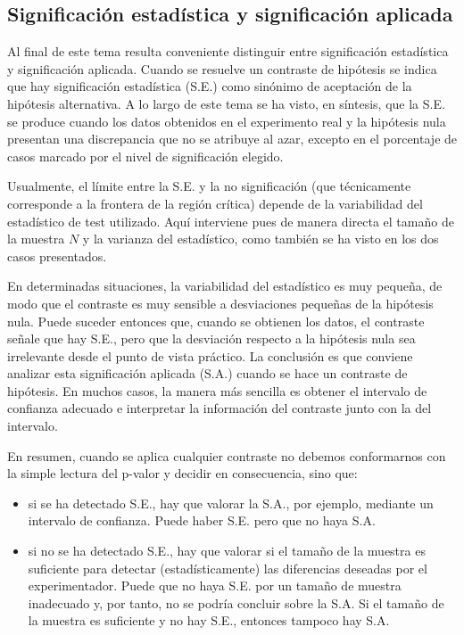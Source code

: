 \documentclass[
]{article}
\providecommand{\tightlist}{%
  \setlength{\itemsep}{0pt}\setlength{\parskip}{0pt}}
\begin{document}
\subsection{Significación estadística y significación aplicada}\label{significaciuxf3n-estaduxedstica-y-significaciuxf3n-aplicada}

Al final de este tema resulta conveniente distinguir entre significación estadística y significación aplicada. Cuando se resuelve un contraste de hipótesis se indica que hay significación estadística (S.E.) como sinónimo de aceptación de la hipótesis alternativa. A lo largo de este tema se ha visto, en síntesis, que la S.E. se produce cuando los datos obtenidos en el experimento real y la hipótesis nula presentan una discrepancia que no se atribuye al azar, excepto en el porcentaje de casos marcado por el nivel de significación elegido.

Usualmente, el límite entre la S.E. y la no significación (que técnicamente corresponde a la frontera de la región crítica) depende de la variabilidad del estadístico de test utilizado. Aquí interviene pues de manera directa el tamaño de la muestra \(N\) y la varianza del estadístico, como también se ha visto en los dos casos presentados.

En determinadas situaciones, la variabilidad del estadístico es muy pequeña, de modo que el contraste es muy sensible a desviaciones pequeñas de la hipótesis nula. Puede suceder entonces que, cuando se obtienen los datos, el contraste señale que hay S.E., pero que la desviación respecto a la hipótesis nula sea irrelevante desde el punto de vista práctico. La conclusión es que conviene analizar esta significación aplicada (S.A.) cuando se hace un contraste de hipótesis. En muchos casos, la manera más sencilla es obtener el intervalo de confianza adecuado e interpretar la información del contraste junto con la del intervalo.

En resumen, cuando se aplica cualquier contraste no debemos conformarnos con la simple lectura del p-valor y decidir en consecuencia, sino que:

\begin{itemize}
\tightlist
\item
  si se ha detectado S.E., hay que valorar la S.A., por ejemplo, mediante un intervalo de confianza. Puede haber S.E. pero que no haya S.A.\\
\item
  si no se ha detectado S.E., hay que valorar si el tamaño de la muestra es suficiente para detectar (estadísticamente) las diferencias deseadas por el experimentador. Puede que no haya S.E. por un tamaño de muestra inadecuado y, por tanto, no se podría concluir sobre la S.A. Si el tamaño de la muestra es suficiente y no hay S.E., entonces tampoco hay S.A.
\end{itemize}
\end{document}
